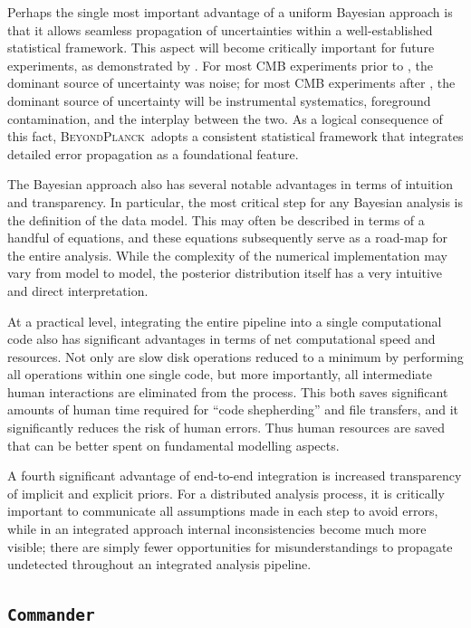 \documentclass[twocolumn]{aa}
\def\commander{\texttt{Commander}}
\newcommand{\BP}{\textsc{BeyondPlanck}}
\begin{document}
Perhaps the single most important advantage of a uniform Bayesian
approach is that it allows seamless propagation of uncertainties
within a well-established statistical framework. This aspect will become critically
important for future experiments, as demonstrated by \Planck. For most
CMB experiments prior to \Planck, the dominant source of uncertainty
was noise; for most CMB experiments after \Planck, the dominant source
of uncertainty will be instrumental systematics, foreground
contamination, and the interplay between the two.  As a logical
consequence of this fact, \BP\ adopts a consistent statistical
framework that integrates detailed error propagation as a foundational
feature.

The Bayesian approach also has several notable advantages in terms of
intuition and transparency. In particular, the most critical step for
any Bayesian analysis is the definition of the data model. This may
often be described in terms of a handful of equations, and these
equations subsequently serve as a road-map for the entire
analysis. While the complexity of the numerical implementation may
vary from model to model, the posterior distribution itself has a very
intuitive and direct interpretation.

At a practical level, integrating the entire pipeline into a single
computational code also has significant advantages in terms of net
computational speed and resources. Not only are slow disk operations
reduced to a minimum by performing all operations within one single
code, but more importantly, all intermediate human interactions are
eliminated from the process. This both saves significant amounts of
human time required for ``code shepherding'' and file transfers, and
it significantly reduces the risk of human errors. Thus human
resources are saved that can be better spent on fundamental modelling
aspects.

A fourth significant advantage of end-to-end integration is increased
transparency of implicit and explicit priors. For a distributed
analysis process, it is critically important to communicate all
assumptions made in each step to avoid errors, while in an integrated
approach internal inconsistencies become much more visible; there are
simply fewer opportunities for misunderstandings to propagate
undetected throughout an integrated analysis pipeline.


\subsection{\commander}
\label{sec:commander}
\end{document}
